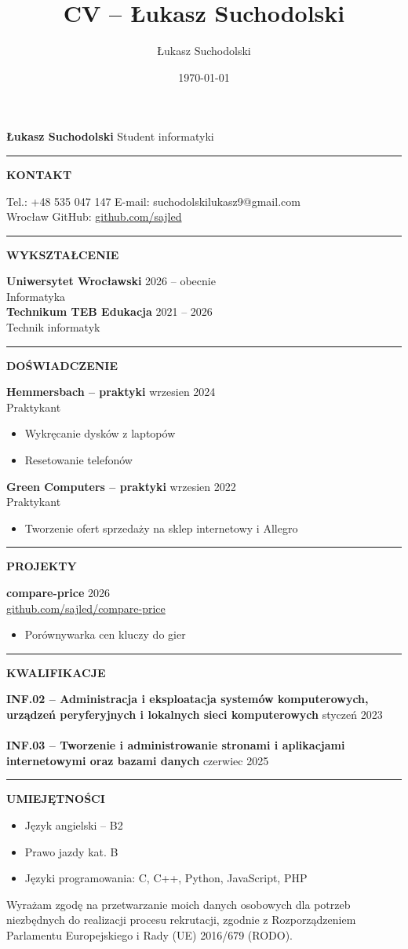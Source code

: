 \documentclass[a4paper]{article}
\author{Łukasz Suchodolski}
\title{CV -- Łukasz Suchodolski}
\date{\today}
\newcommand{\cvsection}[2]{%
  \vspace{5pt}\hrule\vspace{6pt}
  \begin{minipage}[t]{0.2\textwidth}\footnotesize\textbf{\MakeUppercase{#1}}\end{minipage}%
  \begin{minipage}[t]{0.78\textwidth}#2\end{minipage}\par}
\newcommand{\wpis}[3]{\textbf{#1} \hfill #2\\ {\small #3}}
\begin{document}
{\Large\textbf{Łukasz Suchodolski}} \hfill Student informatyki

\cvsection{Kontakt}{%
  Tel.: +48 535 047 147 \hfill E-mail: suchodolskilukasz9@gmail.com\\
  Wrocław \hfill GitHub: \href{https://github.com/sajled}{github.com/sajled}}

\cvsection{Wykształcenie}{%
  \wpis{Uniwersytet Wrocławski}{2026 -- obecnie}{Informatyka}\\[6pt]
  \wpis{Technikum TEB Edukacja}{2021 -- 2026}{Technik informatyk}}

\cvsection{Doświadczenie}{%
  \wpis{Hemmersbach -- praktyki}{wrzesien 2024}{Praktykant}
  \begin{itemize}
    \item Wykręcanie dysków z laptopów
    \item Resetowanie telefonów
  \end{itemize}
  \vspace{4pt}
  \wpis{Green Computers -- praktyki}{wrzesien 2022}{Praktykant}
  \begin{itemize}
    \item Tworzenie ofert sprzedaży na sklep internetowy i Allegro
  \end{itemize}}

\cvsection{Projekty}{%
  \wpis{compare-price}{2026}{\href{https://github.com/sajled/compare-price}{github.com/sajled/compare-price}}
  \begin{itemize}
    \item Porównywarka cen kluczy do gier
  \end{itemize}}

\cvsection{Kwalifikacje}{%
  \wpis{INF.02 -- Administracja i eksploatacja systemów komputerowych, urządzeń peryferyjnych i lokalnych sieci komputerowych}{styczeń 2023}{}\\[6pt]
  \wpis{INF.03 -- Tworzenie i administrowanie stronami i aplikacjami internetowymi oraz bazami danych}{czerwiec 2025}{}}


\cvsection{Umiejętności}{%
  \begin{itemize}
    \item Język angielski -- B2
    \item Prawo jazdy kat. B
    \item Języki programowania: C, C++, Python, JavaScript, PHP
  \end{itemize}}

\vfill{\tiny Wyrażam zgodę na przetwarzanie moich danych osobowych dla potrzeb niezbędnych do realizacji procesu rekrutacji, zgodnie z Rozporządzeniem Parlamentu Europejskiego i Rady (UE) 2016/679 (RODO).}
\end{document}
